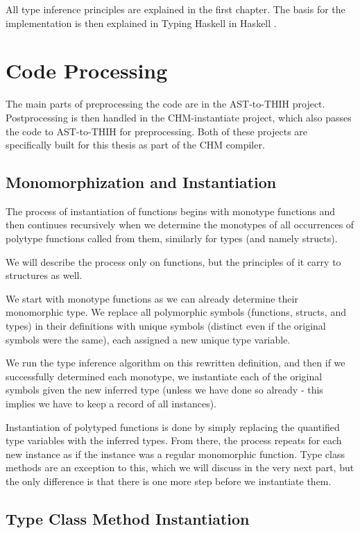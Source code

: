 All type inference principles are explained in the first chapter. The basis for the implementation is then explained in Typing Haskell in Haskell \cite{jones1999typing}.

\section{Code Processing}

The main parts of preprocessing the code are in the AST-to-THIH project. Postprocessing is then handled in the CHM-instantiate project, which also passes the code to AST-to-THIH for preprocessing. Both of these projects are specifically built for this thesis as part of the CHM compiler.

\subsection{Monomorphization and Instantiation}

The process of instantiation of functions begins with monotype functions and then continues recursively when we determine the monotypes of all occurrences of polytype functions called from them, similarly for types (and namely structs).

We will describe the process only on functions, but the principles of it carry to structures as well.

We start with monotype functions as we can already determine their monomorphic type. We replace all polymorphic symbols (functions, structs, and types) in their definitions with unique symbols (distinct even if the original symbols were the same), each assigned a new unique type variable.

We run the type inference algorithm on this rewritten definition, and then if we successfully determined each monotype, we instantiate each of the original symbols given the new inferred type (unless we have done so already - this implies we have to keep a record of all instances).

Instantiation of polytyped functions is done by simply replacing the quantified type variables with the inferred types. From there, the process repeats for each new instance as if the instance was a regular monomorphic function. Type class methods are an exception to this, which we will discuss in the very next part, but the only difference is that there is one more step before we instantiate them.

\subsection{Type Class Method Instantiation}

